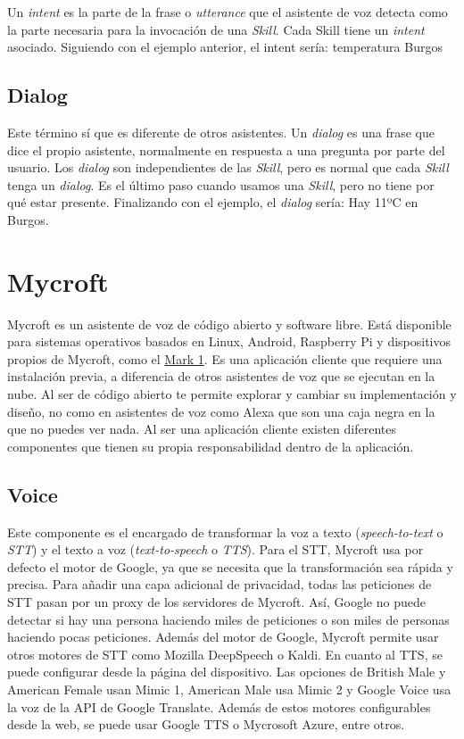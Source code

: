 Un \textit{intent} es la parte de la frase o \textit{utterance} que el asistente de voz detecta como la parte necesaria para la invocación de una \textit{Skill}. Cada Skill tiene un \textit{intent} asociado. Siguiendo con el ejemplo anterior, el intent sería: temperatura Burgos

\subsection{Dialog}

Este término sí que es diferente de otros asistentes. Un \textit{dialog} es una frase que dice el propio asistente, normalmente en respuesta a una pregunta por parte del usuario. Los \textit{dialog} son independientes de las \textit{Skill}, pero es normal que cada \textit{Skill} tenga un \textit{dialog}. Es el último paso cuando usamos una \textit{Skill}, pero no tiene por qué estar presente. Finalizando con el ejemplo, el \textit{dialog} sería: Hay 11ºC en Burgos.

\section{Mycroft}

Mycroft es un asistente de voz de código abierto y software libre. Está disponible para sistemas operativos basados en Linux, Android, Raspberry Pi y dispositivos propios de Mycroft, como el \href{https://mycroft.ai/product/mycroft-mark-1/}{Mark 1}. Es una aplicación cliente que requiere una instalación previa, a diferencia de otros asistentes de voz que se ejecutan en la nube. Al ser de código abierto te permite explorar y cambiar su implementación y diseño, no como en asistentes de voz como Alexa que son una caja negra en la que no puedes ver nada. Al ser una aplicación cliente existen diferentes componentes que tienen su propia responsabilidad dentro de la aplicación.

\subsection{Voice}

Este componente es el encargado de transformar la voz a texto (\textit{speech-to-text} o \textit{STT}) y el texto a voz (\textit{text-to-speech} o \textit{TTS}).
Para el STT, Mycroft usa por defecto el motor de Google, ya que se necesita que la transformación sea rápida y precisa. Para añadir una capa adicional de privacidad, todas las peticiones de STT pasan por un proxy de los servidores de Mycroft. Así, Google no puede detectar si hay una persona haciendo miles de peticiones o son miles de personas haciendo pocas peticiones. Además del motor de Google, Mycroft permite usar otros motores de STT como Mozilla DeepSpeech o Kaldi.
En cuanto al TTS, se puede configurar desde la página del dispositivo. Las opciones de British Male y American Female usan Mimic 1, American Male usa Mimic 2 y Google Voice usa la voz de la API de Google Translate. Además de estos motores configurables desde la web, se puede usar Google TTS o Mycrosoft Azure, entre otros.

